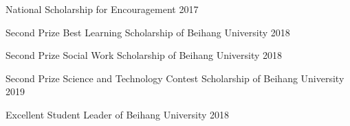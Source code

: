 



\begin{cvhonors}

    \cvhonor
        {National Scholarship for Encouragement} %
        {} %
        {} %
        {2017} %

    \cvhonor
        {Second Prize}
        {Best Learning Scholarship of Beihang University}
        {}
        {2018}

    \cvhonor
        {Second Prize}
        {Social Work Scholarship of Beihang University}
        {}
        {2018}

    \cvhonor
        {Second Prize}
        {Science and Technology Contest Scholarship of Beihang University}
        {}
        {2019}

    \cvhonor
        {Excellent Student Leader of Beihang University}
        {}
        {}
        {2018}

\end{cvhonors}
